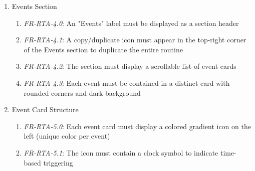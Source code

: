 \documentclass[conference]{IEEEtran}
\begin{document}
\begin{enumerate}
\begin{enumerate}
                            \item \textit{FR-RTA-3.0}: A "When" label must be displayed above the day selection buttons
                            \item \textit{FR-RTA-3.1}: Seven day buttons must be displayed in a horizontal row: S, M, T, W, TH, F, SA
                            \item \textit{FR-RTA-3.2}: Each day button must be a rounded square with uniform size and spacing
                            \item \textit{FR-RTA-3.3}: Selected days must have white background; unselected days must have dark/transparent background
                            \item \textit{FR-RTA-3.4}: Multiple days can be selected simultaneously
                            \item \textit{FR-RTA-3.5}: At least one day must be selected for the routine to be valid
                            \item \textit{FR-RTA-3.6}: Tapping a selected day must deselect it; tapping an unselected day must select it
                        \end{enumerate}
                    \item Events Section
                        \begin{enumerate}
                            \item \textit{FR-RTA-4.0}: An "Events" label must be displayed as a section header
                            \item \textit{FR-RTA-4.1}: A copy/duplicate icon must appear in the top-right corner of the Events section to duplicate the entire routine
                            \item \textit{FR-RTA-4.2}: The section must display a scrollable list of event cards
                            \item \textit{FR-RTA-4.3}: Each event must be contained in a distinct card with rounded corners and dark background
                        \end{enumerate}
                    \item Event Card Structure
                        \begin{enumerate}
                            \item \textit{FR-RTA-5.0}: Each event card must display a colored gradient icon on the left (unique color per event)
                            \item \textit{FR-RTA-5.1}: The icon must contain a clock symbol to indicate time-based triggering

\end{enumerate}
\end{enumerate}
\end{document}
